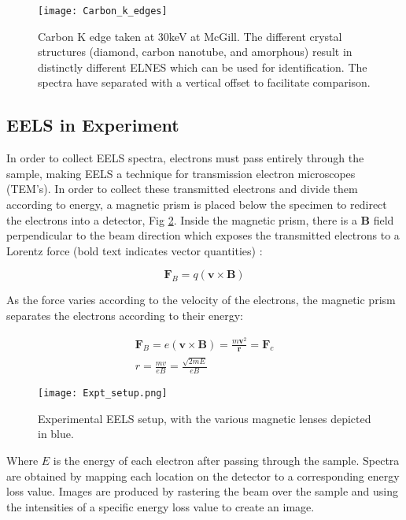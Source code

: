 \begin{figure}
	\centering
	\texttt{[image: Carbon\_k\_edges]}
	\caption{Carbon K edge taken at 30keV at McGill. The different crystal structures (diamond, carbon nanotube, and amorphous) result in distinctly different ELNES which can be used for identification. The spectra have separated with a vertical offset to facilitate comparison. }
	\label{carbon-k-edge}
\end{figure}


\subsection{EELS in Experiment}

In order to collect EELS spectra, electrons must pass entirely through the sample, making EELS a technique for transmission electron microscopes (TEM's)\cite{Egerton}. In order to collect these transmitted electrons and divide them according to energy, a magnetic prism is placed below the specimen to redirect the electrons into a detector,  Fig \ref{prism}.  Inside the magnetic prism, there is a $\mathrm{\textbf{B}}$ field perpendicular to the beam direction which exposes the transmitted electrons to a Lorentz force (bold text indicates vector quantities) \cite{griffiths_em}: 


\begin{equation}
	\textbf{F}_B = q (\textbf{v} \times \textbf{B})
\end{equation}

As the force varies according to the velocity of the electrons, the magnetic prism  separates the electrons according to their energy: 

\begin{gather}
\textbf{F}_B = e (\textbf{v} \times \textbf{B}) =  \frac{m \textbf{v}^2}{\textbf{r}} = \textbf{F}_c \\
 r =  \frac{mv}{eB} = \frac{\sqrt{2mE}}{eB}
\end{gather}

\begin{figure}
 \centering
 \texttt{[image: Expt\_setup.png]}
 \caption{Experimental EELS setup, with the various magnetic lenses depicted in blue.  }
 \label{prism}
 
\end{figure}

Where  $E$ is the energy of each electron after passing through the sample.  Spectra are obtained by mapping each location on the detector to a corresponding energy loss value. Images are produced by  rastering the beam over the sample and using the intensities of a specific energy loss value to create an image.\\ 

